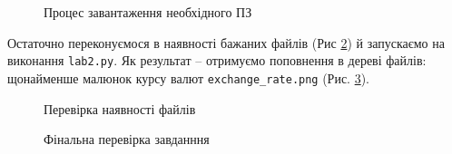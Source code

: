 \documentclass[a4paper,14pt]{extarticle} %
\begin{document}
\begin{figure}[H]
    \caption{Процес завантаження необхідного ПЗ}
    \label{fig:git:install git}
\end{figure}

Остаточно переконуємося в наявності бажаних файлів (Рис \ref{fig:git:check files on instance}) й запускаємо 
на виконання \texttt{lab2.py}. Як результат -- отримуємо поповнення в дереві файлів: щонайменше малюнок курсу 
валют \texttt{exchange\_rate.png} (Рис. \ref{fig:git:final check}).

\begin{figure}[H]
    \caption{Перевірка наявності файлів}
    \label{fig:git:check files on instance}
\end{figure}

\begin{figure}[H]
    \caption{Фінальна перевірка завданння}
    \label{fig:git:final check}
\end{figure}
\end{document}
